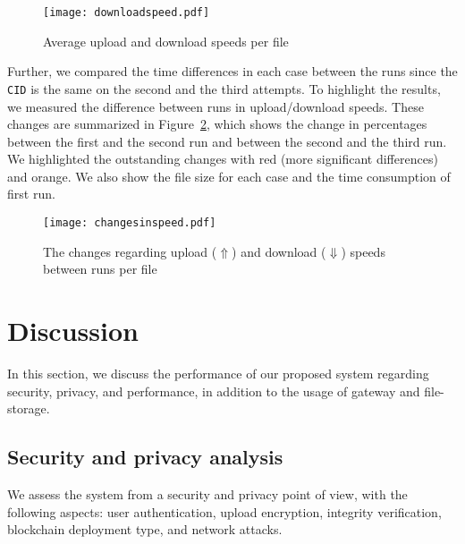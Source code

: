 \documentclass[conference]{IEEEtran}
\begin{document}
\begin{figure}[t]
\centering
\texttt{[image: downloadspeed.pdf]}
\caption{Average upload and download speeds per file}
\label{fig:tikz}
\vspace{-2mm}
\end{figure}


Further, we compared the time differences in each case between the runs since the \texttt{CID} is the same on the second and the third attempts. To highlight the results, we measured the difference between runs in upload/download speeds. These changes are summarized in Figure~\ref{fig:sum}, which shows the change in percentages between the first and the second run and between the second and the third run. We highlighted the outstanding changes with red (more significant differences) and orange. We also show the file size for each case and the time consumption of first run.

\begin{figure}[t]
\centering
\texttt{[image: changesinspeed.pdf]}
\caption{The changes regarding upload ($\Uparrow$) and download ($\Downarrow$) speeds between runs per file}
\label{fig:sum}
\vspace{-2mm}
\end{figure}


\section{Discussion} \label{sec:5}

In this section, we discuss the performance of our proposed system regarding security, privacy, and performance, in addition to the usage of gateway and file-storage.

\subsection{Security and privacy analysis}
We assess the system from a security and privacy point of view, with the following aspects: user authentication, upload encryption, integrity verification, blockchain deployment type, and network attacks.
\end{document}
